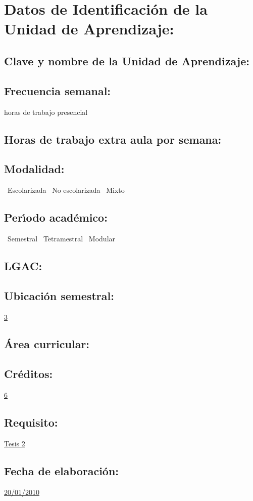 \documentclass[10 pt]{article}
\begin{document}


\section{Datos de Identificaci\'{o}n de la Unidad de Aprendizaje:}
\subsection{Clave y nombre de la Unidad de Aprendizaje:} 
\subsection{Frecuencia semanal:} horas de trabajo presencial 
\subsection{Horas de trabajo extra aula por semana:} 
\subsection{Modalidad:} \yes~Escolarizada \no~No escolarizada \no~Mixto
\subsection{Per\'{\i}odo acad\'{e}mico:} \yes~Semestral
\no~Tetramestral \no~Modular
\subsection{LGAC:} \underline{\odsi}
\subsection{Ubicaci\'{o}n semestral:} \underline{3}
\subsection{\'{A}rea curricular:} \underline{\pi}
\subsection{Cr\'{e}ditos:} \underline{6}
\subsection{Requisito:} \underline{Tesis 2}
\subsection{Fecha de elaboraci\'{o}n:} \underline{20/01/2010}
\end{document}
